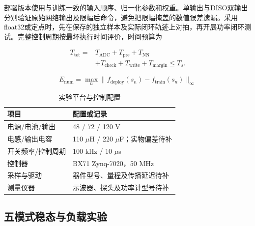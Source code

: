 \documentclass[UTF8,fontset=fandol,a4paper,twocolumn,10pt]{ctexart}
\begin{document}
部署版本使用与训练一致的输入顺序、归一化参数和权重。单输出与DISO双输出分别验证原始网络输出及限幅后命令，避免把限幅掩盖的数值误差遗漏。采用float32或定点时，先在保存的独立样本及实际闭环轨迹上对拍，再开展功率闭环测试。完整控制周期按最坏执行时间评价，时间预算为

\begin{equation}\begin{aligned}T_{\mathrm{tot}}={}&T_{\mathrm{ADC}}+T_{\mathrm{pre}}+T_{\mathrm{NN}}\\ &+T_{\mathrm{check}}+T_{\mathrm{write}}+T_{\mathrm{margin}}\le T_s.\end{aligned}\label{eq:42}\end{equation}

\begin{equation}E_{\mathrm{num}}=\max_n\|f_{\mathrm{deploy}}(s_n)-f_{\mathrm{train}}(s_n)\|_\infty\label{eq:43}\end{equation}

\begin{table}[!htbp]\centering\caption{实验平台与控制配置}\label{tab:8}\small\setlength{\tabcolsep}{3pt}
\begin{tabularx}{\columnwidth}{YY}\toprule
\textbf{项目} & \textbf{配置或记录}\\\midrule
电源/电池/输出 & 48 / 72 / 120 V\\
电感/输出电容 & 110 $\mu$H / 220 $\mu$F；实物偏差待补\\
开关频率/控制周期 & 100 kHz / 10 $\mu$s\\
控制器 & BX71 Zynq-7020，50 MHz\\
采样与驱动 & 器件型号、量程及传播延迟待补\\
测量仪器 & 示波器、探头及功率计型号待补\\
\bottomrule\end{tabularx}
\end{table}

\begin{center}
\label{fig:13}\end{center}


\subsection{五模式稳态与负载实验}
\end{document}
